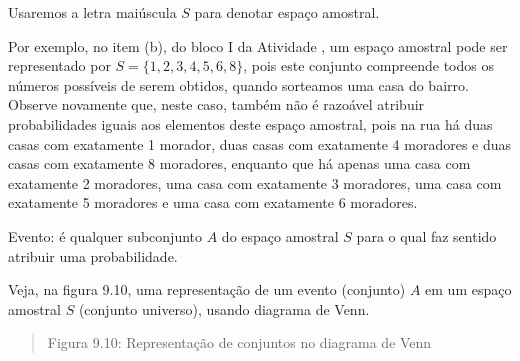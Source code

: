 Usaremos a letra maiúscula \(S\) para denotar espaço amostral.

Por exemplo, no item (b), do bloco I da Atividade , um espaço amostral pode ser representado por \(S=\{1,2,3,4,5,6,8\}\), pois este conjunto compreende todos os números possíveis de serem obtidos, quando sorteamos uma casa do bairro. Observe novamente que, neste caso, também não é razoável atribuir probabilidades iguais aos elementos deste espaço amostral, pois na rua há duas casas com exatamente 1 morador, duas casas com exatamente 4 moradores e duas casas com exatamente 8 moradores, enquanto que há apenas uma casa com exatamente 2 moradores, uma casa com  exatamente 3 moradores, uma casa com exatamente 5 moradores e uma casa com exatamente 6 moradores.
\begin{description}
\item[{Evento: é qualquer subconjunto \(A\) do espaço amostral \(S\) para o qual faz sentido atribuir uma probabilidade.}] \leavevmode{}\label{\detokenize{PE511-1:term-evento-e-qualquer-subconjunto-do-espaco-amostral-para-o-qual-faz-sentido-atribuir-uma-probabilidade}}
\end{description}

Veja, na figura 9.10, uma representação de um evento (conjunto) \(A\) em um espaço amostral \(S\) (conjunto universo), usando diagrama de Venn.
\begin{quote}
\begin{center}\end{center}
Figura 9.10: Representação de conjuntos no diagrama de Venn
\end{quote}

